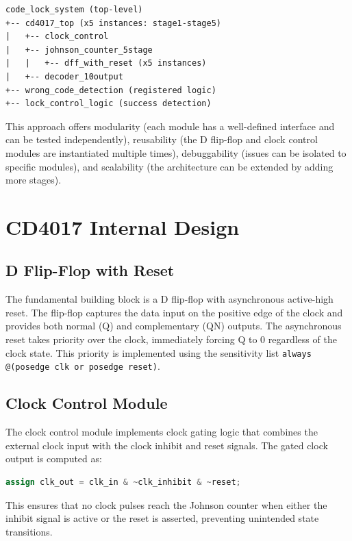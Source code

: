 \documentclass[12pt,a4paper]{report}
\begin{document}
\begin{verbatim}
code_lock_system (top-level)
+-- cd4017_top (x5 instances: stage1-stage5)
|   +-- clock_control
|   +-- johnson_counter_5stage
|   |   +-- dff_with_reset (x5 instances)
|   +-- decoder_10output
+-- wrong_code_detection (registered logic)
+-- lock_control_logic (success detection)
\end{verbatim}

This approach offers modularity (each module has a well-defined interface and can be tested independently), reusability (the D flip-flop and clock control modules are instantiated multiple times), debuggability (issues can be isolated to specific modules), and scalability (the architecture can be extended by adding more stages).

\section{CD4017 Internal Design}

\subsection{D Flip-Flop with Reset}

The fundamental building block is a D flip-flop with asynchronous active-high reset. The flip-flop captures the data input on the positive edge of the clock and provides both normal (Q) and complementary (QN) outputs. The asynchronous reset takes priority over the clock, immediately forcing Q to 0 regardless of the clock state. This priority is implemented using the sensitivity list \texttt{always @(posedge clk or posedge reset)}.

\subsection{Clock Control Module}

The clock control module implements clock gating logic that combines the external clock input with the clock inhibit and reset signals. The gated clock output is computed as:

\begin{lstlisting}[language=Verilog]
assign clk_out = clk_in & ~clk_inhibit & ~reset;
\end{lstlisting}

This ensures that no clock pulses reach the Johnson counter when either the inhibit signal is active or the reset is asserted, preventing unintended state transitions.
\end{document}
